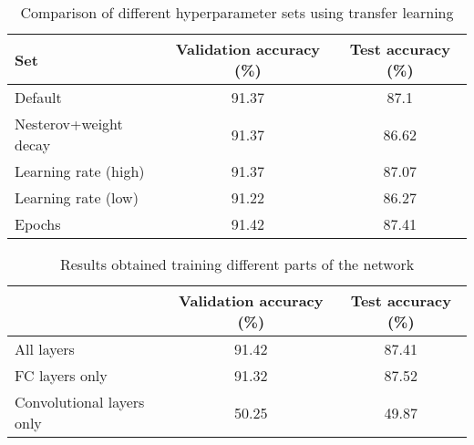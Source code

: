 \documentclass[11pt,twoside,a4paper]{article}
\begin{document}
\begin{table}[!t]
  \begin{adjustwidth}{-.5in}{-.5in}
  \begin{center}
    \begin{tabular}{l | c | c}
       Set & Validation accuracy (\%) & Test accuracy (\%) \\
      \hline
	Default & 91.37 & 87.1\\
	Nesterov+weight decay & 91.37 & 86.62\\
	Learning rate (high) & 91.37 & 87.07\\
	Learning rate (low) & 91.22 & 86.27\\
	Epochs & 91.42 & 87.41\\
    \end{tabular}
    \caption{Comparison of different hyperparameter sets using transfer learning}
    \label{tab:hyperparams2}
  \end{center}
  \end{adjustwidth}
\end{table}

\begin{table}[!b]
  \begin{adjustwidth}{-.5in}{-.5in}
  \begin{center}
    \begin{tabular}{l | c | c}
       & Validation accuracy (\%) & Test accuracy (\%) \\
      \hline
	All layers & 91.42 & 87.41\\
	FC layers only & 91.32 & 87.52\\
	Convolutional layers only & 50.25 & 49.87\\
    \end{tabular}
    \caption{Results obtained training different parts of the network}
    \label{tab:freeze}
  \end{center}
  \end{adjustwidth}
\end{table}
\end{document}
